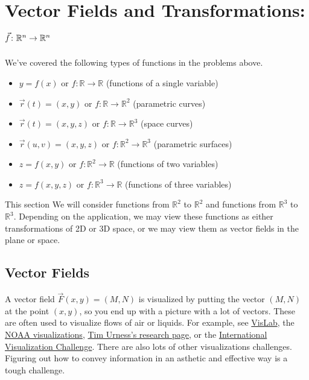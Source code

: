 \section{Vector Fields and Transformations: $\vec f\colon \mathbb{R}^n\to\mathbb{R}^n$}

We've covered the following types of functions in the problems above.
\begin{itemize}
 \item $y=f(x)$ or $f\colon \mathbb{R}\to\mathbb{R}$ (functions of a single variable)
 \item $\vec r(t)=(x,y)$ or $f\colon \mathbb{R}\to\mathbb{R}^2$ (parametric curves)
 \item $\vec r(t)=(x,y,z)$ or $f\colon \mathbb{R}\to\mathbb{R}^3$ (space curves)
 \item $\vec r(u,v)=(x,y,z)$ or $f\colon \mathbb{R}^2\to\mathbb{R}^3$ (parametric surfaces)
 \item $z=f(x,y)$ or $f\colon \mathbb{R}^2\to\mathbb{R}$ (functions of two variables)
 \item $z=f(x,y,z)$ or $f\colon \mathbb{R}^3\to\mathbb{R}$ (functions of three variables)
\end{itemize}
This section We will consider functions from $\mathbb{R}^2$ to $\mathbb{R}^2$ and functions from $\mathbb{R}^3$ to $\mathbb{R}^3$.  Depending on the application, we may view these functions as either transformations of 2D or 3D space, or we may view them as vector fields in the plane or space.


\subsection{Vector Fields}

A vector field $\vec F(x,y)=(M,N)$ is visualized by putting the vector $(M,N)$ at the point $(x,y)$, so you end up with a picture with a lot of vectors.  These are often used to visualize flows of air or liquids.  For example, see \href{http://ccom.unh.edu/vislab/projects/2d_flow_vis.html}{VisLab}, the \href{http://nowcoast.noaa.gov/}{NOAA visualizations},  \href{http://artsci.drake.edu/urness/research.html}{Tim Urness's research page}, or the \href{http://www.nsf.gov/news/special_reports/scivis/}{International Visualization Challenge}.  There are also lots of other visualizations challenges.  Figuring out how to convey information in an asthetic and effective way is a tough challenge.

